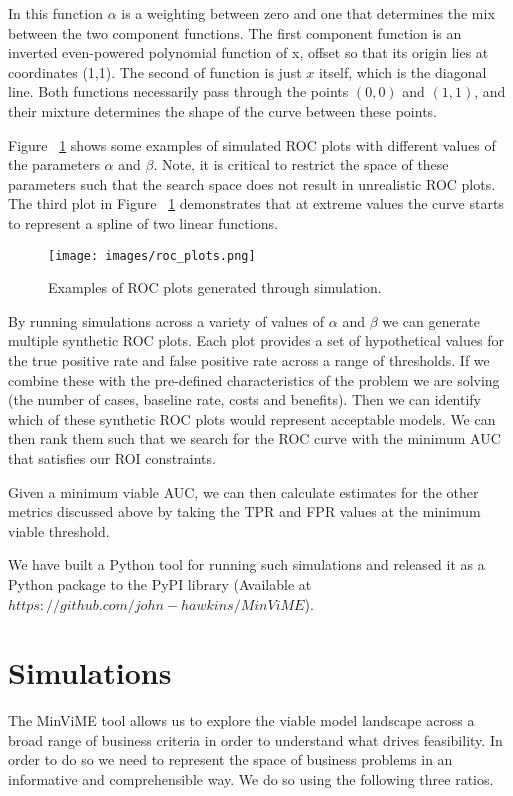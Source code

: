 \documentclass[11pt,a4paper]{article}
\begin{document}
In this function $\alpha$ is a weighting between zero and one that determines the
mix between the two component functions. The first component function is an
inverted even-powered polynomial function of x, offset so that its origin
lies at coordinates {(1,1)}.
The second of function is just $x$ itself, which is the diagonal line.
Both functions necessarily pass through
the points $(0,0)$ and $(1,1)$, and their mixture determines the shape of the
curve between these points.

Figure ~\ref{fig:ROC} shows some examples of simulated ROC plots with different values of
the parameters $\alpha$ and $\beta$. Note, it is critical to restrict the space of these parameters such
that the search space does not result in unrealistic ROC plots. The third plot in Figure ~\ref{fig:ROC}
demonstrates that at extreme values the curve starts to represent a spline of two linear functions.

\begin{figure}[h!]
\texttt{[image: images/roc\_plots.png]}
\caption{Examples of ROC plots generated through simulation.}
\label{fig:ROC}
\end{figure}


By running simulations across a variety of values of $\alpha$ and $\beta$
we can generate multiple synthetic ROC plots. Each plot provides a set of hypothetical
values for the true positive rate and false positive rate across a range of thresholds.
If we combine these with the pre-defined characteristics of the problem we are solving
(the number of cases, baseline rate, costs and benefits). Then we can identify which
of these synthetic ROC plots would represent acceptable models. We can then rank
them such that we search for the ROC curve with the minimum AUC that satisfies our
ROI constraints.

Given a minimum viable AUC, we can then calculate estimates for the other metrics discussed
above by taking the TPR and FPR values at the minimum viable threshold.

We have built a Python tool for running such simulations and released it as a Python package
to the PyPI library (Available at $https://github.com/john-hawkins/MinViME$).

\section{Simulations}

The MinViME tool allows us to explore the viable model landscape across a broad range of business
criteria in order to understand what drives feasibility. In order to do so we need to represent
the space of business problems in an informative and comprehensible way. We do so using the following
three ratios.
\end{document}
